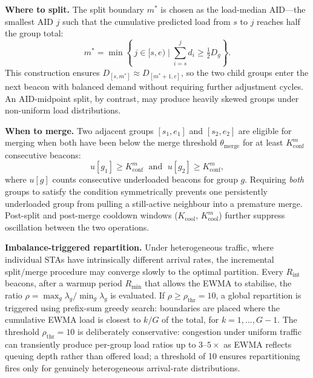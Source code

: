 \documentclass[conference]{IEEEtran}
\begin{document}
\textbf{Where to split.}
The split boundary $m^*$ is chosen as the load-median AID---the smallest
AID $j$ such that the cumulative predicted load from $s$ to $j$ reaches
half the group total:
\begin{equation}
  m^* = \min\!\left\{\,j \in [s,e)\;\Big|\;\sum_{i=s}^{j}d_i \geq
    \tfrac{1}{2}D_g\right\}.
  \label{eq:split_mid}
\end{equation}
This construction ensures $D_{[s,m^*]} \approx D_{[m^*+1,e]}$,
so the two child groups enter the next beacon with balanced demand
without requiring further adjustment cycles.
An AID-midpoint split, by contrast, may produce heavily skewed groups
under non-uniform load distributions.

\textbf{When to merge.}
Two adjacent groups $[s_1,e_1]$ and $[s_2,e_2]$ are eligible for merging
when both have been below the merge threshold $\theta_\mathrm{merge}$ for
at least $K_\mathrm{conf}^m$ consecutive beacons:
\begin{equation}
  u[g_1] \geq K_\mathrm{conf}^m \;\text{ and }\; u[g_2] \geq K_\mathrm{conf}^m,
  \label{eq:merge_guard}
\end{equation}
where $u[g]$ counts consecutive underloaded beacons for group $g$.
Requiring \emph{both} groups to satisfy the condition symmetrically
prevents one persistently underloaded group from pulling a still-active
neighbour into a premature merge.
Post-split and post-merge cooldown windows ($K_\mathrm{cool}$,
$K_\mathrm{cool}^m$) further suppress oscillation between the two
operations.

\textbf{Imbalance-triggered repartition.}
Under heterogeneous traffic, where individual STAs have intrinsically
different arrival rates, the incremental split/merge procedure may converge
slowly to the optimal partition.
Every $R_\mathrm{int}$ beacons, after a warmup period $R_\mathrm{min}$
that allows the EWMA to stabilise, the ratio
$\rho\!=\!\max_g\lambda_g/\min_g\lambda_g$ is evaluated.
If $\rho\!\geq\!\rho_\mathrm{thr}\!=\!10$, a global repartition is
triggered using prefix-sum greedy search: boundaries are placed where
the cumulative EWMA load is closest to $k/G$ of the total, for
$k\!=\!1,\ldots,G\!-\!1$.
The threshold $\rho_\mathrm{thr}\!=\!10$ is deliberately conservative:
congestion under uniform traffic can transiently produce per-group load
ratios up to $3$--$5\times$ as EWMA reflects queuing depth rather than
offered load; a threshold of 10 ensures repartitioning fires only for
genuinely heterogeneous arrival-rate distributions.
\end{document}

